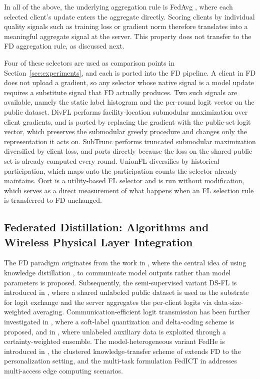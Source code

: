 \documentclass[journal]{IEEEtran}
\newcommand{\rev}[1]{#1}
\begin{document}
In all of the above, the underlying aggregation rule is FedAvg \cite{mcmahan2017communication}, where each selected client's update enters the aggregate directly. Scoring clients by individual quality signals such as training loss or gradient norm therefore translates into a meaningful aggregate signal at the server. This property does not transfer to the FD aggregation rule, as discussed next.

\rev{Four of these selectors are used as comparison points in Section~\ref{sec:experiments}, and each is ported into the FD pipeline. A client in FD does not upload a gradient, so any selector whose native signal is a model update requires a substitute signal that FD actually produces. Two such signals are available, namely the static label histogram and the per-round logit vector on the public dataset. DivFL \cite{balakrishnan2022divfl} performs facility-location submodular maximization over client gradients, and is ported by replacing the gradient with the public-set logit vector, which preserves the submodular greedy procedure and changes only the representation it acts on. SubTrunc \cite{castillo2025subtrunc} performs truncated submodular maximization diversified by client loss, and ports directly because the loss on the shared public set is already computed every round. UnionFL \cite{castillo2025subtrunc} diversifies by historical participation, which maps onto the participation counts the selector already maintains. Oort \cite{lai2021oort} is a utility-based FL selector and is run without modification, which serves as a direct measurement of what happens when an FL selection rule is transferred to FD unchanged.}

\subsection{Federated Distillation: Algorithms and Wireless Physical Layer Integration}
\label{ssec:rw-fd}

The FD paradigm originates from the work in \cite{jeong2018communication}, where the central idea of using knowledge distillation \cite{hinton2015distilling}, \cite{wang2022kd} to communicate model outputs rather than model parameters is proposed. Subsequently, the semi-supervised variant DS-FL is introduced in \cite{itahara2023distillation}, where a shared unlabeled public dataset is used as the substrate for logit exchange and the server aggregates the per-client logits via data-size-weighted averaging. Communication-efficient logit transmission has been further investigated in \cite{sattler2022cfd}, where a soft-label quantization and delta-coding scheme is proposed, and in \cite{sattler2023fedaux}, where unlabeled auxiliary data is exploited through a certainty-weighted ensemble. The model-heterogeneous variant FedHe is introduced in \cite{chan2021fedhe}, the clustered knowledge-transfer scheme of \cite{cho2023clustered} extends FD to the personalization setting, and the multi-task formulation FedICT in \cite{wu2024fedict} addresses multi-access edge computing scenarios.
\end{document}
